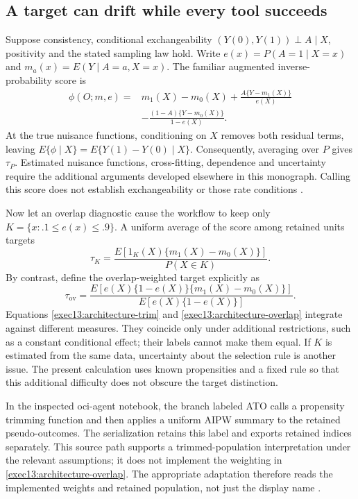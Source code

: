 \subsection{A target can drift while every tool succeeds}

Suppose consistency, conditional exchangeability
$(Y(0),Y(1))\perp A\mid X$, positivity and the stated sampling law hold.
Write $e(x)=P(A=1\mid X=x)$ and $m_a(x)=E(Y\mid A=a,X=x)$.
The familiar augmented inverse-probability score is
\begin{align}
 \phi(O;m,e)={}&m_1(X)-m_0(X)
   +\frac{A\{Y-m_1(X)\}}{e(X)}\nonumber\\
 &-\frac{(1-A)\{Y-m_0(X)\}}{1-e(X)}.
 \label{exec13:architecture-score}
\end{align}
At the true nuisance functions, conditioning on $X$ removes both residual
terms, leaving $E\{\phi\mid X\}=E\{Y(1)-Y(0)\mid X\}$.
Consequently, averaging over $P$ gives $\tau_P$. Estimated nuisance functions,
cross-fitting, dependence and uncertainty require the additional arguments
developed elsewhere in this monograph. Calling this score does not establish
exchangeability or those rate conditions \cite{hernan2020}.

Now let an overlap diagnostic cause the workflow to keep only
$K=\{x:.1\leq e(x)\leq .9\}$. A uniform average of the score among retained
units targets
\begin{equation}
 \tau_K=\frac{E[1_K(X)\{m_1(X)-m_0(X)\}]}{P(X\in K)}.
 \label{exec13:architecture-trim}
\end{equation}
By contrast, define the overlap-weighted target explicitly as
\begin{equation}
 \tau_{\mathrm{ov}}=
 \frac{E[e(X)\{1-e(X)\}\{m_1(X)-m_0(X)\}]}
      {E[e(X)\{1-e(X)\}]}.
 \label{exec13:architecture-overlap}
\end{equation}
Equations \eqref{exec13:architecture-trim} and
\eqref{exec13:architecture-overlap} integrate against different measures.
They coincide only under additional restrictions, such as a constant
conditional effect; their labels cannot make them equal. If $K$ is estimated
from the same data, uncertainty about the selection rule is another issue.
The present calculation uses known propensities and a fixed rule so that this
additional difficulty does not obscure the target distinction.

In the inspected oci-agent notebook, the branch labeled ATO calls a propensity
trimming function and then applies a uniform AIPW summary to the retained
pseudo-outcomes. The serialization retains this label and exports retained
indices separately. This source path supports a trimmed-population
interpretation under the relevant assumptions; it does not implement the
weighting in \eqref{exec13:architecture-overlap}. The appropriate adaptation
therefore reads the implemented weights and retained population, not just the
display name \cite{v12_la_package_oci_agent}.


